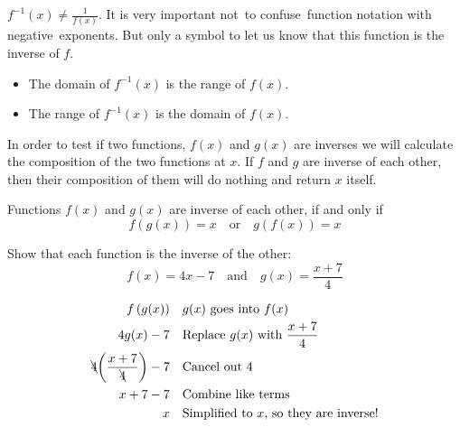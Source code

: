 %
\begin{nt}
$f^{-1}(x) \neq \frac{1}{f(x)}$. It is very important not to confuse function notation with negative exponents. But only a symbol to let us know that this function is the inverse of $f$.
\end{nt}
%
\begin{tcolorbox}[
                    title=Domain and range of inverse function,
                    fonttitle=\bfseries,
                    colframe=blue!70!red,
                    colback=white]
    \begin{itemize}
        \item The domain of $f^{-1}(x)$ is the range of $f(x)$.
        \item The range of $f^{-1}(x)$ is the domain of $f(x)$.
    \end{itemize}
\end{tcolorbox}
In order to test if two functions, $f(x)$ and $g(x)$ are inverses we will calculate the composition of the two functions at $x$. If $f$ and $g$ are inverse of each other, then their composition of them will do nothing and return $x$ itself.
\begin{tcolorbox}[
                    title=Test if two functions are inverse,fonttitle=\bfseries,
                    colframe=blue!70!red,
                    colback=white]
    Functions $f(x)$ and $g(x)$ are inverse of each other, if and only if
    \begin{equation}
            f(g(x)) = x \quad \text{or} \quad g(f(x))=x
            \label{inv_property}
    \end{equation}
\end{tcolorbox}
\begin{exa}
    Show that each function is the inverse of the other:
    \begin{equation*}
        f(x)= 4x-7 \quad \text{and} \quad g(x)=\frac{x+7}{4}
    \end{equation*}
\end{exa}
%
\begin{align*}
            f\left(g(x)\right)&     &   &\text{$g(x)$ goes into $f(x)$}\\
            4g(x)-7&    &   &\text{Replace $g(x)$ with $\frac{x+7}{4}$}\\
            \bcancel{4}\biggl(\frac{x+7}{\bcancel{4}}\biggr)-7&     &   &\text{Cancel out 4}\\
            x+7-7&  &   &\text{Combine like terms}\\
            x&  &   &\text{Simplified to $x$, so they are inverse!}
\end{align*}    
